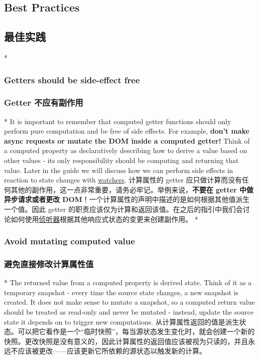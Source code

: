 \begin{paracol}{2}
\subsection{Best Practices}
\switchcolumn
\subsection{最佳实践}
\switchcolumn[0]*%
\subsubsection{Getters should be side-effect free}
\switchcolumn
\subsubsection{Getter 不应有副作用}
\switchcolumn[0]*%
It is important to remember that computed getter functions should only
perform pure computation and be free of side effects. For example,
\textbf{don't make async requests or mutate the DOM inside a computed
getter!} Think of a computed property as declaratively describing how to
derive a value based on other values - its only responsibility should be
computing and returning that value. Later in the guide we will discuss
how we can perform side effects in reaction to state changes with
\href{https://vuejs.org/guide/essentials/watchers.html}{watchers}.
\switchcolumn
计算属性的 getter
应只做计算而没有任何其他的副作用，这一点非常重要，请务必牢记。举例来说，\textbf{不要在
getter 中做异步请求或者更改
DOM}！一个计算属性的声明中描述的是如何根据其他值派生一个值。因此 getter
的职责应该仅为计算和返回该值。在之后的指引中我们会讨论如何使用\href{https://cn.vuejs.org/guide/essentials/watchers.html}{侦听器}根据其他响应式状态的变更来创建副作用。
\switchcolumn[0]*%
\subsubsection{Avoid mutating computed value}
\switchcolumn
\subsubsection{避免直接修改计算属性值}
\switchcolumn[0]*%
The returned value from a computed property is derived state. Think of
it as a temporary snapshot - every time the source state changes, a new
snapshot is created. It does not make sense to mutate a snapshot, so a
computed return value should be treated as read-only and never be
mutated - instead, update the source state it depends on to trigger new
computations.
\switchcolumn
从计算属性返回的值是派生状态。可以把它看作是一个``临时快照''，每当源状态发生变化时，就会创建一个新的快照。更改快照是没有意义的，因此计算属性的返回值应该被视为只读的，并且永远不应该被更改------应该更新它所依赖的源状态以触发新的计算。
\end{paracol}